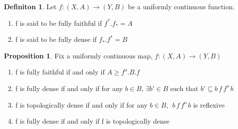 \documentclass[18pt,a4paper]{article}
\theoremstyle{definition}
\newtheorem{definition}{Definiton}[section]
\newtheorem{proop}{Proposition}[section]
\begin{document}
	\begin{definition} %
		Let $f:(X,A) \to (Y,B)$ be a uniformly continuous function.
		\begin{enumerate}[label=\Roman*]
			\item f is said to be fully faithful if	$f^* .f_*=A $
			\item f is said to be fully dense if $f_* .f^*=B $
		\end{enumerate}
	\end{definition}
		\begin{proop}
			Fix a uniformly continuous map, $f:(X,A) \rightarrow (Y,B)$
			\begin{enumerate}[label=(\alph*)]
				\item f is fully faithful if and only if $A\geq f^o.B.f$
				\item f is fully dense if and only if for any $b\in B$, $\exists b' \in B$
					such that $b' \subseteq b\,f\,f^o \,b$
				\item f is topologically dense if and only if for any $b\in B$,
					 $\; b \, f\, f^o\,b$ is reflexive
				\item f is fully dense if and only if f is topologically dense
			\end{enumerate}
		\end{proop}
\end{document}
